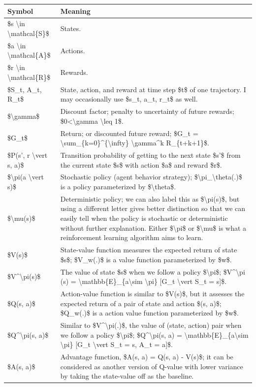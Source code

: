 \begin{longtable}[]{@{}ll@{}}
\toprule\noalign{}
Symbol & Meaning \\
\midrule\noalign{}
\endhead
\bottomrule\noalign{}
\endlastfoot
\$s \textbackslash in \textbackslash mathcal\{S\}\$ & States. \\
\$a \textbackslash in \textbackslash mathcal\{A\}\$ & Actions. \\
\$r \textbackslash in \textbackslash mathcal\{R\}\$ & Rewards. \\
\$S\_t, A\_t, R\_t\$ & State, action, and reward at time step \$t\$ of one trajectory. I may occasionally use \$s\_t, a\_t, r\_t\$ as well. \\
\$\textbackslash gamma\$ & Discount factor; penalty to uncertainty of future rewards; \$0\textless\textbackslash gamma \textbackslash leq 1\$. \\
\$G\_t\$ & Return; or discounted future reward; \$G\_t = \textbackslash sum\_\{k=0\}\^{}\{\textbackslash infty\} \textbackslash gamma\^{}k R\_\{t+k+1\}\$. \\
\$P(s', r \textbackslash vert s, a)\$ & Transition probability of getting to the next state \$s'\$ from the current state \$s\$ with action \$a\$ and reward \$r\$. \\
\$\textbackslash pi(a \textbackslash vert s)\$ & Stochastic policy (agent behavior strategy); \$\textbackslash pi\_\textbackslash theta(.)\$ is a policy parameterized by \$\textbackslash theta\$. \\
\$\textbackslash mu(s)\$ & Deterministic policy; we can also label this as \$\textbackslash pi(s)\$, but using a different letter gives better distinction so that we can easily tell when the policy is stochastic or deterministic without further explanation. Either \$\textbackslash pi\$ or \$\textbackslash mu\$ is what a reinforcement learning algorithm aims to learn. \\
\$V(s)\$ & State-value function measures the expected return of state \$s\$; \$V\_w(.)\$ is a value function parameterized by \$w\$. \\
\$V\^{}\textbackslash pi(s)\$ & The value of state \$s\$ when we follow a policy \$\textbackslash pi\$; \$V\^{}\textbackslash pi (s) = \textbackslash mathbb\{E\}\_\{a\textbackslash sim \textbackslash pi\} {[}G\_t \textbackslash vert S\_t = s{]}\$. \\
\$Q(s, a)\$ & Action-value function is similar to \$V(s)\$, but it assesses the expected return of a pair of state and action \$(s, a)\$; \$Q\_w(.)\$ is a action value function parameterized by \$w\$. \\
\$Q\^{}\textbackslash pi(s, a)\$ & Similar to \$V\^{}\textbackslash pi(.)\$, the value of (state, action) pair when we follow a policy \$\textbackslash pi\$; \$Q\^{}\textbackslash pi(s, a) = \textbackslash mathbb\{E\}\_\{a\textbackslash sim \textbackslash pi\} {[}G\_t \textbackslash vert S\_t = s, A\_t = a{]}\$. \\
\$A(s, a)\$ & Advantage function, \$A(s, a) = Q(s, a) - V(s)\$; it can be considered as another version of Q-value with lower variance by taking the state-value off as the baseline. \\
\end{longtable}

